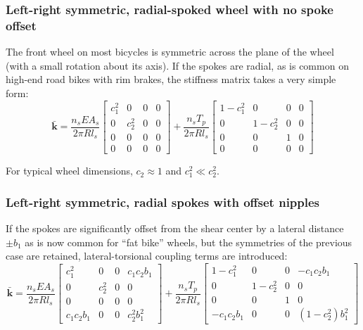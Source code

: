 \documentclass[\rootdir/thesis.tex]{subfiles}
\begin{document}
\subsubsection{Left-right symmetric, radial-spoked wheel with no spoke offset}
The front wheel on most bicycles is symmetric across the plane of the wheel (with a small rotation about its axis). If the spokes are radial, as is common on high-end road bikes with rim brakes, the stiffness matrix takes a very simple form:
\begin{equation}
\label{eq:kbar_symm_radial}
\bar{\mathbf{k}} = \frac{n_s EA_s}{2\pi R l_s}
\begin{bmatrix}
c_1^2     & 0 & 0 & 0\\
0 & c_2^2 & 0 & 0\\
0 & 0     & 0 & 0\\
0 & 0     & 0 & 0
\end{bmatrix} +
\frac{n_s T_p}{2\pi R l_s}
\begin{bmatrix}
1-c_1^2 & 0       & 0 & 0\\
0       & 1-c_2^2 & 0 & 0\\
0       & 0       & 1 & 0\\
0       & 0       & 0 & 0
\end{bmatrix}
\end{equation}

For typical wheel dimensions, $c_2 \approx 1$ and $c_1^2 \ll c_2^2$.

\subsubsection{Left-right symmetric, radial spokes with offset nipples}

If the spokes are significantly offset from the shear center by a lateral distance $\pm b_1$ as is now common for ``fat bike'' wheels, but the symmetries of the previous case are retained, lateral-torsional coupling terms are introduced:
\begin{equation}
\label{eq:kbar_symm_offset}
\bar{\mathbf{k}} = \frac{n_s EA_s}{2\pi R l_s}
\begin{bmatrix}
c_1^2     & 0 & 0 & c_1c_2 b_1\\
0 & c_2^2 & 0 & 0\\
0 & 0     & 0 & 0\\
c_1c_2b_1 & 0     & 0 & c_2^2b_1^2
\end{bmatrix} +
\frac{n_s T_p}{2\pi R l_s}
\begin{bmatrix}
1-c_1^2    & 0       & 0 & -c_1c_2b_1\\
0          & 1-c_2^2 & 0 & 0\\
0          & 0       & 1 & 0\\
-c_1c_2b_1 & 0       & 0 & (1-c_2^2)b_1^2
\end{bmatrix}
\end{equation}
\end{document}
